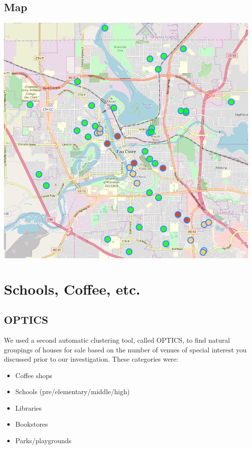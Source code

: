 \documentclass{beamer}
\begin{document}
\subsection{Map}
\begin{frame}
    \includegraphics[scale=0.45]{Densities.png}
\end{frame}

\section{Schools, Coffee, etc.}
\subsection{OPTICS}
\begin{frame}
    We used a second automatic clustering tool, called OPTICS, to find natural groupings of houses for sale based on the number of venues of special interest you discussed prior to our investigation. These categories were:
    \begin{itemize}
        \item Coffee shops
        \item Schools (pre/elementary/middle/high)
        \item Libraries
        \item Bookstores
        \item Parks/playgrounds
    \end{itemize}
\end{frame}
\end{document}
